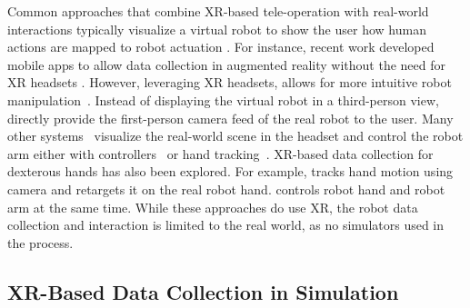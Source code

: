 Common approaches that combine XR-based tele-operation with real-world interactions typically visualize a virtual robot to show the user how human actions are mapped to robot actuation \cite{Qin2023AnyTeleopAG}. For instance, recent work developed mobile apps to allow data collection in augmented reality without the need for XR headsets \cite{ar2-d2-pmlr-v229-duan23a, eve}. However, leveraging XR headsets, allows for more intuitive robot manipulation~\cite{arcade,armada,jiang2024comprehensive}.
Instead of displaying the virtual robot in a third-person view, \citet{opentelevision, openteach} directly provide the first-person camera feed of the real robot to the user.
Many other systems~\cite{vicarios,augmentedvisualcues,wang2024robotic,immertwin,sharedctlframework,digitaltwinmr} visualize the real-world scene in the headset and control the robot arm either with controllers~\cite{sharedctlframework} or hand tracking~\cite{wang2024robotic}.
XR-based data collection for dexterous hands has also been explored. For example, \citet{arunachalam2023holo} tracks hand motion using camera and retargets it on the real robot hand. \citet{chen2024arcap} controls robot hand and robot arm at the same time. While these approaches do use XR, the robot data collection and interaction is limited to the real world, as no simulators used in the process.





\subsection{XR-Based Data Collection in Simulation}

